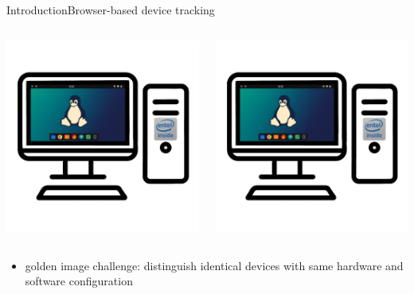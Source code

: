 \documentclass[aspectratio=169, hyperref={colorlinks=true, allcolors=SecondaryColor}, c]{beamer}
\begin{document}
\begin{frame}[fragile]{Introduction}{Browser-based device tracking}
\begin{columns}
\begin{column}{0.33\textwidth}
			\includegraphics[width=1\textwidth]{./figures/computer_alpha_screen_2_golden.png}
		\end{column}
		\begin{column}{0.33\textwidth}
			\includegraphics[width=1\textwidth]{./figures/computer_alpha_screen_2_golden.png}
		\end{column}
	\end{columns}
	\vspace{-0.5cm}
	\begin{itemize}
		\item \alert{golden image challenge:} distinguish identical devices with same hardware and software configuration
	\end{itemize}
\end{frame}
\end{document}
